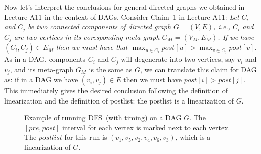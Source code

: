 Now let's interpret the conclusions for general directed graphs we obtained in  Lecture A11 in the context of DAGs.
Consider Claim~1 in Lecture A11: \emph{Let $C_i$ and $C_j$ be two connected components of directed graph $G = (V, E)$, i.e., $C_i$ and $C_j$ are two
vertices in its coresponding meta-graph $G_M = (V_M, E_M)$. If we have $(C_i, C_j) \in E_M$ then
we must have that $\max_{u\in C_i} post[u] > \max_{v\in C_j} post[v]$.}
As in a DAG, components $C_i$ and $C_j$ will degenerate into two vertices, say $v_i$ and $v_j$, and
its meta-graph $G_M$ is the same as $G$, we can translate this claim for DAG as: 
if in a DAG we have $(v_i, v_j) \in E$ then we must have $post[i] > post[j]$.
This immediately gives the desired conclusion following the definition of linearization
and the definition of postlist: the postlist is a linearization of $G$.

\begin{figure}[h!]
\centering{}
\caption{Example of running DFS~(with timing) on a DAG $G$. The $[pre,post]$ interval for each vertex
is marked next to each vertex. The $postlist$ for this run is $(v_1, v_5, v_2, v_4, v_6, v_3)$, which is a linearization of $G$.}
\label{fig:meta-graph}
\end{figure}


